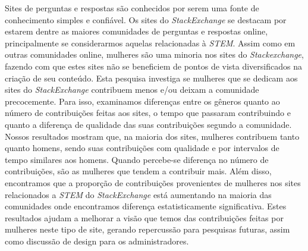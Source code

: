 Sites de perguntas e respostas são conhecidos por serem uma fonte de conhecimento simples e confiável. Os sites do \emph{StackExchange} se destacam por estarem dentre as maiores comunidades de perguntas e respostas online, principalmente se considerarmos aquelas relacionadas à \textit{STEM}. Assim como em outras comunidades online, mulheres são uma minoria nos sites do \emph{Stackexchange}, fazendo com que estes sites não se beneficiem de pontos de vista diversificados na criação de seu conteúdo. Esta pesquisa investiga se mulheres que se dedicam aos sites do \emph{StackExchange} contribuem menos e/ou deixam a comunidade precocemente. Para isso, examinamos diferenças entre os gêneros quanto ao número de contribuições feitas aos sites, o tempo que passaram contribuindo e quanto a diferença de qualidade das suas contribuições segundo a comunidade. Nossos resultados mostram que, na maioria dos sites, mulheres contribuem tanto quanto homens, sendo suas contribuições com qualidade e por intervalos de tempo similares aos homens. Quando percebe-se diferença no número de contribuições, são as mulheres que tendem a contribuir mais. Além disso, encontramos que a proporção de contribuições provenientes de mulheres nos sites relacionados a \emph{STEM} do \emph{StackExchange} está aumentando na maioria das comunidades onde encontramos diferença estatisticamente significativa. Estes resultados ajudam a melhorar a visão que temos das contribuições feitas por mulheres neste tipo de site, gerando repercussão para pesquisas futuras, assim como discussão de design para os administradores.

